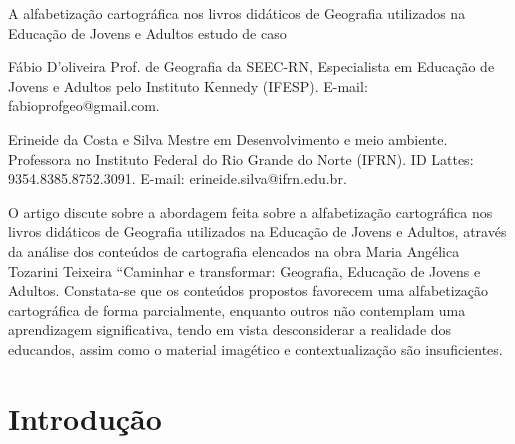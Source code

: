 \begin{refsection}
    \renewcommand{\thefigure}{\arabic{figure}}
    \renewcommand{\thetable}{\arabic{table}}
    
    \chapterTwoLines
    {A alfabetização cartográfica nos livros didáticos de Geografia utilizados na Educação de Jovens e Adultos}
    {estudo de caso}
    \label{chap:alfabetizacao-cartog}

    \articleAuthor
    {Fábio D'oliveira}
    {Prof. de Geografia da SEEC-RN, Especialista em Educação de Jovens e Adultos pelo Instituto Kennedy (IFESP). E-mail: fabioprofgeo@gmail.com.}
    
    \articleAuthor
    {Erineide da Costa e Silva}
    {Mestre em Desenvolvimento e meio ambiente. Professora no Instituto Federal do Rio Grande do Norte (IFRN). ID Lattes: 9354.8385.8752.3091. E-mail: erineide.silva@ifrn.edu.br.}
    
    \begin{galoResumo}
        O artigo discute sobre a abordagem feita sobre a alfabetização cartográfica nos livros didáticos de Geografia utilizados na Educação de Jovens e Adultos, através da análise dos conteúdos de cartografia elencados na obra Maria Angélica Tozarini Teixeira “Caminhar e transformar: Geografia, Educação de Jovens e Adultos. Constata-se que os conteúdos propostos favorecem uma alfabetização cartográfica de forma parcialmente, enquanto outros não contemplam uma aprendizagem significativa, tendo em vista desconsiderar a realidade dos educandos, assim como o material imagético e contextualização são insuficientes. 
    \end{galoResumo}
    



    \section{Introdução}


\end{refsection}
